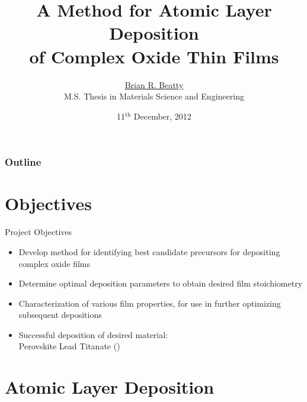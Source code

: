 \documentclass[professionalfont]{beamer}
\title[ALD of Complex Oxides]%
{\LARGE A Method for Atomic Layer Deposition\\
of Complex Oxide Thin Films}
\author[B. R. Beatty]{\underline{{\Large Brian R. Beatty}}\\[1em]%
				M.S. Thesis in Materials Science and Engineering}
\date[12/11/2012]{\small 11$^{\mathrm{th}}$ December, 2012}
\institute[Drexel University]{\large Drexel University, Philadelphia, PA}
\begin{document}
\begin{frame}
\titlepage
\end{frame}

\begin{frame}
\frametitle{Outline}
\Large
\tableofcontents
\end{frame}


\section{Objectives}

\begin{frame}{Project Objectives}

\begin{itemize}
	\item Develop method for identifying best candidate precursors for depositing complex oxide films
	\vspace{1.5em}
	\item Determine optimal deposition parameters to obtain desired film stoichiometry
	\vspace{1.5em}
	\item Characterization of various film properties, for use in further optimizing subsequent depositions
	\vspace{1.5em}
	\item Successful deposition of desired material: \\Perovskite Lead Titanate ()
\end{itemize}

\end{frame}


\section{Atomic Layer Deposition}

\end{document}
